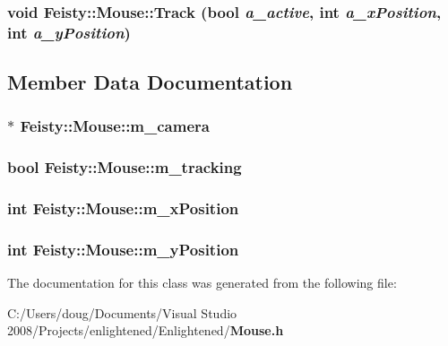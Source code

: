 \subsubsection[{Track}]{\setlength{\rightskip}{0pt plus 5cm}void Feisty::Mouse::Track (bool {\em a\_\-active}, \/  int {\em a\_\-xPosition}, \/  int {\em a\_\-yPosition})\hspace{0.3cm}{\ttfamily  [inline]}}\label{class_feisty_1_1_mouse_a69620259109ddf559576565a4363ea10}


\subsection{Member Data Documentation}
\subsubsection[{m\_\-camera}]{$\ast$ {\bf Feisty::Mouse::m\_\-camera}\hspace{0.3cm}{\ttfamily  [protected]}}\label{class_feisty_1_1_mouse_a144e77580d9067ccb09a401fea5c60f2}
\subsubsection[{m\_\-tracking}]{\setlength{\rightskip}{0pt plus 5cm}bool {\bf Feisty::Mouse::m\_\-tracking}\hspace{0.3cm}{\ttfamily  [protected]}}\label{class_feisty_1_1_mouse_a27b4fe989daff9bd9ff031b485a5f51a}
\subsubsection[{m\_\-xPosition}]{\setlength{\rightskip}{0pt plus 5cm}int {\bf Feisty::Mouse::m\_\-xPosition}\hspace{0.3cm}{\ttfamily  [protected]}}\label{class_feisty_1_1_mouse_a57c3e21679268866baf51dc697ea682a}
\subsubsection[{m\_\-yPosition}]{\setlength{\rightskip}{0pt plus 5cm}int {\bf Feisty::Mouse::m\_\-yPosition}\hspace{0.3cm}{\ttfamily  [protected]}}\label{class_feisty_1_1_mouse_ac066192462fc496bd68f47c5bcfee6e4}


The documentation for this class was generated from the following file:\begin{DoxyCompactItemize}
\item 
C:/Users/doug/Documents/Visual Studio 2008/Projects/enlightened/Enlightened/{\bf Mouse.h}\end{DoxyCompactItemize}
